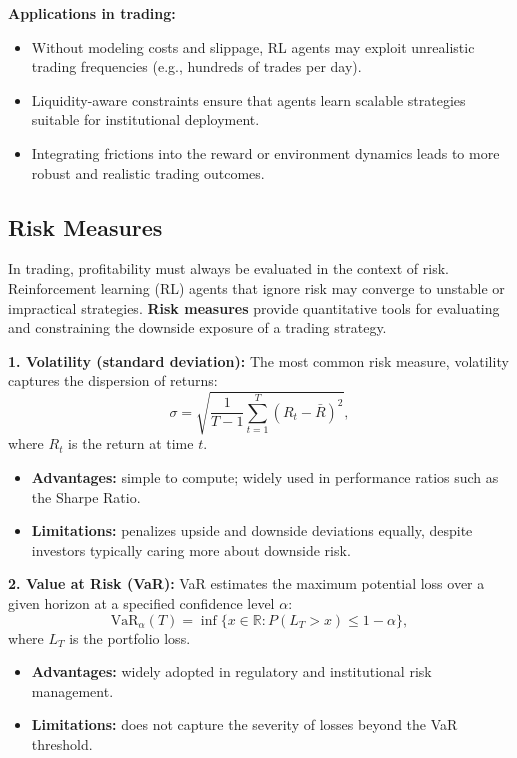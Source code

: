 \documentclass[12pt,a4paper]{report}
\begin{document}
\bigskip
\textbf{Applications in trading:}  
\begin{itemize}
    \item Without modeling costs and slippage, RL agents may exploit unrealistic trading frequencies (e.g., hundreds of trades per day).
    \item Liquidity-aware constraints ensure that agents learn scalable strategies suitable for institutional deployment.
    \item Integrating frictions into the reward or environment dynamics leads to more robust and realistic trading outcomes.
\end{itemize}

\subsection{Risk Measures}

In trading, profitability must always be evaluated in the context of risk. Reinforcement learning (RL) agents that ignore risk may converge to unstable or impractical strategies. \textbf{Risk measures} provide quantitative tools for evaluating and constraining the downside exposure of a trading strategy.

\bigskip
\textbf{1. Volatility (standard deviation):}  
The most common risk measure, volatility captures the dispersion of returns:
\[
\sigma = \sqrt{\frac{1}{T-1}\sum_{t=1}^T (R_t - \bar{R})^2},
\]
where $R_t$ is the return at time $t$.  
\begin{itemize}
    \item \textbf{Advantages:} simple to compute; widely used in performance ratios such as the Sharpe Ratio.
    \item \textbf{Limitations:} penalizes upside and downside deviations equally, despite investors typically caring more about downside risk.
\end{itemize}

\bigskip
\textbf{2. Value at Risk (VaR):}  
VaR estimates the maximum potential loss over a given horizon at a specified confidence level $\alpha$:
\[
\text{VaR}_{\alpha}(T) = \inf \{ x \in \mathbb{R} : P(L_T > x) \leq 1-\alpha \},
\]
where $L_T$ is the portfolio loss.  
\begin{itemize}
    \item \textbf{Advantages:} widely adopted in regulatory and institutional risk management.
    \item \textbf{Limitations:} does not capture the severity of losses beyond the VaR threshold.
\end{itemize}
\end{document}
